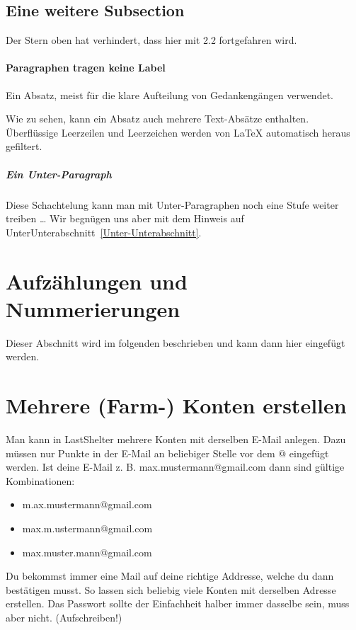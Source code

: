 \documentclass[fontsize=12pt,a4paper,draft]{scrartcl}[2003/01/01]
\begin{document}
  

\subsection[Eine Subsection]{Eine weitere Subsection}
Der Stern oben hat verhindert, dass hier mit 2.2 fortgefahren wird.

\paragraph[Label wird nicht aufgeführt]{%
  Paragraphen tragen keine Label}

Ein Absatz, meist für die klare Aufteilung von Gedankengängen verwendet.

Wie zu sehen, kann ein Absatz auch mehrere Text-Absätze enthalten. Überflüssige Leerzeilen und Leerzeichen werden von \LaTeX{} automatisch heraus gefiltert.

\subparagraph[Ein Subparagraph: Label wird nicht aufgeführt]{Ein Unter-Paragraph}

Diese Schachtelung kann man mit Unter-Paragraphen noch eine Stufe weiter treiben \ldots{}
%
Wir begnügen uns aber mit dem Hinweis auf Unter\-Unterabschnitt~\ref{Unter-Unterabschnitt}.

\section[Aufzählungen]{Aufzählungen und Nummerierungen}
Dieser Abschnitt wird im folgenden beschrieben und kann dann 
hier eingefügt werden.

\section{Mehrere (Farm-) Konten erstellen}

Man kann in LastShelter mehrere Konten mit derselben E-Mail anlegen. Dazu müssen nur Punkte in der E-Mail an beliebiger Stelle vor dem @ eingefügt werden.
Ist deine E-Mail z. B. max.mustermann@gmail.com dann sind gültige Kombinationen: 
\begin{itemize}
  \item m.ax.mustermann@gmail.com
  \item max.m.ustermann@gmail.com
  \item max.muster.mann@gmail.com
\end{itemize}	

Du bekommst immer eine Mail auf deine richtige Addresse, welche du dann bestätigen musst.
So lassen sich beliebig viele Konten mit derselben Adresse erstellen. Das Passwort sollte der Einfachheit halber immer dasselbe sein, muss aber nicht. (Aufschreiben!)
\end{document}
